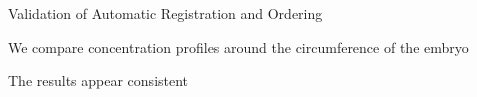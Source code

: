 \documentclass[10pt]{beamer}
\begin{document}
\begin{frame}{Validation of Automatic Registration and Ordering}


\begin{center}

We compare concentration profiles around the circumference of the embryo


\end{center}

\begin{minipage}{3.1in}
\centering
The results appear consistent 


\end{minipage}
\end{frame}
\end{document}
